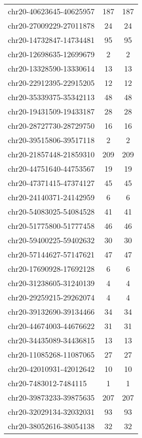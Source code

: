\documentclass[10pt,letterpaper]{article}
\begin{document}
{\begin{longtable}{lSS}
	chr20-40623645-40625957 & 187    & 187      \\
	chr20-27009229-27011878 & 24     & 24       \\
	chr20-14732847-14734481 & 95     & 95       \\
	chr20-12698635-12699679 & 2      & 2        \\
	chr20-13328590-13330614 & 13     & 13       \\
	chr20-22912395-22915205 & 12     & 12       \\
	chr20-35339375-35342113 & 48     & 48       \\
	chr20-19431509-19433187 & 28     & 28       \\
	chr20-28727730-28729750 & 16     & 16       \\
	chr20-39515806-39517118 & 2      & 2        \\
	chr20-21857448-21859310 & 209    & 209      \\
	chr20-44751640-44753567 & 19     & 19       \\
	chr20-47371415-47374127 & 45     & 45       \\
	chr20-24140371-24142959 & 6      & 6        \\
	chr20-54083025-54084528 & 41     & 41       \\
	chr20-51775800-51777458 & 46     & 46       \\
	chr20-59400225-59402632 & 30     & 30       \\
	chr20-57144627-57147621 & 47     & 47       \\
	chr20-17690928-17692128 & 6      & 6        \\
	chr20-31238605-31240139 & 4      & 4        \\
	chr20-29259215-29262074 & 4      & 4        \\
	chr20-39132690-39134466 & 34     & 34       \\
	chr20-44674003-44676622 & 31     & 31       \\
	chr20-34435089-34436815 & 13     & 13       \\
	chr20-11085268-11087065 & 27     & 27       \\
	chr20-42010931-42012642 & 10     & 10       \\
	chr20-7483012-7484115   & 1      & 1        \\
	chr20-39873233-39875635 & 207    & 207      \\
	chr20-32029134-32032031 & 93     & 93       \\
	chr20-38052616-38054138 & 32     & 32       \\

\end{longtable}}
\end{document}
